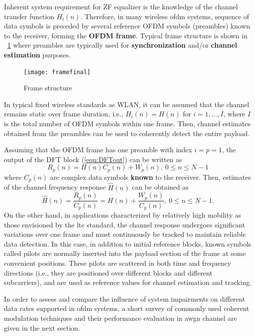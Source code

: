 Inherent system requirement for ZF equalizer is the knowledge of the channel transfer function $H_i(n)$. Therefore, in many wireless \gls{ofdm} systems, sequence of data symbols is preceded by several reference OFDM symbols (preambles) known to the receiver, forming the \textbf{OFDM frame}. Typical frame structure is shown in {~\cref{fig:frame}} where preambles are typically used for \textbf{synchronization} and/or \textbf{channel estimation} purposes.
%
\begin{figure}[thb]
\centering
\texttt{[image: framefinal]}
\caption{Frame structure\label{fig:frame}}
\end{figure}
%
In typical fixed wireless standards as WLAN, it can be assumed that the channel remains static over frame duration, i.e., $H_i(n) = H(n)$ for $i = 1,\ldots,I$, where $I$ is the total number of OFDM symbols within one frame. Then, channel estimates obtained from the preambles can be used to coherently detect the entire payload.

Assuming that the OFDM frame has one preamble with index $i=p=1$, the output of the DFT block (\ref{eqn:DFTout}) can be written as
%
\begin{equation}
\label{eqn:DFToutPream}
 R_p(n)=H(n)C_p(n) + W_p(n),\ 0\leq n \leq N-1
\end{equation}
%
where $C_p(n)$ are complex data symbols \textbf{known} to the receiver. Then, estimates of the {channel frequency response} $\hat{H}(n)$ can be obtained as
%
\begin{equation}
\label{eqn:Estimates}
 \hat{H}(n) = \frac{R_p(n)}{C_p(n)}=H(n) + \frac{W_p(n)}{C_p(n)},\ 0\leq n \leq N-1.
\end{equation}
%
On the other hand, in applications characterized by relatively high mobility as those envisioned by the \gls{lte} standard, the channel response undergoes significant variations over one frame and must continuously be tracked to maintain reliable data detection. In this case, in addition to initial reference blocks, known symbols called pilots are normally inserted into the payload section of the frame at some convenient positions. These pilots are scattered in both time and frequency directions (i.e., they are positioned over different blocks and different subcarriers), and are used as reference values for channel estimation and tracking.

In order to assess and compare the influence of system impairments on different data rates supported in \gls{ofdm} systems, a short survey of commonly used coherent modulation techniques and their performance evaluation in \gls{awgn} channel are given in the next section.


